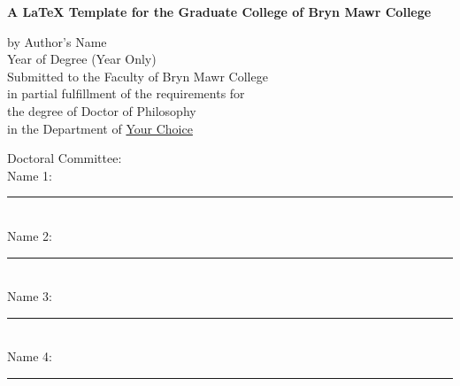 \thispagestyle{plain}
\begin{titlepage}
    
        \begin{center}
            \vspace*{1in}
            
            \textbf{A LaTeX Template for the Graduate College of Bryn Mawr College}
            \vspace{2.0in} 
        
            by Author's Name\\
            Year of Degree (Year Only)\\
            \vspace{1.0in}
            \singlespace
            Submitted to the Faculty of Bryn Mawr College\\
            in partial fulfillment of the requirements for\\
            the degree of Doctor of Philosophy\\
            in the Department of \underline{Your Choice}
        
        \end{center}
        \singlespace
        \begin{samepage}
        \vspace{1.0in} 
        \begin{flushleft}
        Doctoral Committee:\\
        \bigskip
        Name 1:~\rule{4cm}{0.15mm}\\
        Name 2:~\rule{4cm}{0.15mm}\\
        Name 3:~\rule{4cm}{0.15mm}\\
        Name 4:~\rule{4cm}{0.15mm}
        \end{flushleft}
   \end{samepage}
\end{titlepage}